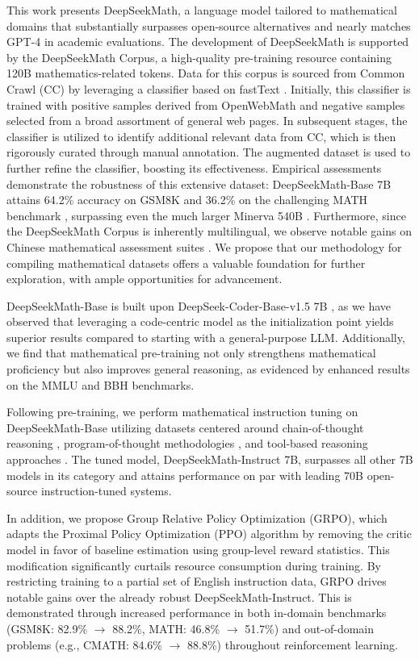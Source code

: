 This work presents DeepSeekMath, a language model tailored to mathematical domains that substantially surpasses open-source alternatives and nearly matches GPT-4 in academic evaluations. The development of DeepSeekMath is supported by the DeepSeekMath Corpus, a high-quality pre-training resource containing 120B mathematics-related tokens. Data for this corpus is sourced from Common Crawl (CC) by leveraging a classifier based on fastText \citep{joulin2016fasttext}. Initially, this classifier is trained with positive samples derived from OpenWebMath \citep{openwebmath} and negative samples selected from a broad assortment of general web pages. In subsequent stages, the classifier is utilized to identify additional relevant data from CC, which is then rigorously curated through manual annotation. The augmented dataset is used to further refine the classifier, boosting its effectiveness. Empirical assessments demonstrate the robustness of this extensive dataset: DeepSeekMath-Base 7B attains 64.2\% accuracy on GSM8K \citep{gsm8k} and 36.2\% on the challenging MATH benchmark \citep{MATH}, surpassing even the much larger Minerva 540B \citep{minerva}. Furthermore, since the DeepSeekMath Corpus is inherently multilingual, we observe notable gains on Chinese mathematical assessment suites \citep{wei2023cmath,agieval}. We propose that our methodology for compiling mathematical datasets offers a valuable foundation for further exploration, with ample opportunities for advancement.

DeepSeekMath-Base is built upon DeepSeek-Coder-Base-v1.5 7B \citep{deepseek-coder}, as we have observed that leveraging a code-centric model as the initialization point yields superior results compared to starting with a general-purpose LLM. Additionally, we find that mathematical pre-training not only strengthens mathematical proficiency but also improves general reasoning, as evidenced by enhanced results on the MMLU \citep{mmlu} and BBH \citep{bbh} benchmarks.

Following pre-training, we perform mathematical instruction tuning on DeepSeekMath-Base utilizing datasets centered around chain-of-thought reasoning \citep{cot}, program-of-thought methodologies \citep{pot,pal}, and tool-based reasoning approaches \citep{tora}. The tuned model, DeepSeekMath-Instruct 7B, surpasses all other 7B models in its category and attains performance on par with leading 70B open-source instruction-tuned systems.

In addition, we propose Group Relative Policy Optimization (GRPO), which adapts the Proximal Policy Optimization (PPO) algorithm \citep{schulman2017proximal} by removing the critic model in favor of baseline estimation using group-level reward statistics. This modification significantly curtails resource consumption during training. By restricting training to a partial set of English instruction data, GRPO drives notable gains over the already robust DeepSeekMath-Instruct. This is demonstrated through increased performance in both in-domain benchmarks (GSM8K: 82.9\% $\rightarrow$ 88.2\%, MATH: 46.8\% $\rightarrow$ 51.7\%) and out-of-domain problems (e.g., CMATH: 84.6\% $\rightarrow$ 88.8\%) throughout reinforcement learning.

